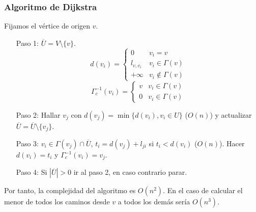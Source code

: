 \documentclass[AL.tex]{subfiles}
\begin{document}
\subsubsection{Algoritmo de Dijkstra}
Fijamos el vértice de origen $v$. 
\begin{enumerate}
\item[Paso 1:] $\overline{U}=V\setminus\{v\}$. $$d(v_i)=\begin{cases}
0 & v_i=v\\
l_{v,v_i} & v_i\in\Gamma(v)\\
+\infty & v_i\notin\Gamma(v)
\end{cases}$$
$$\Gamma^{-1}_c(v_i)=\begin{cases}
v & v_i\in\Gamma(v)\\
0 & v_i\in\Gamma(v)
\end{cases}$$
\item[Paso 2:] Hallar $v_j$ con $d(v_j)=\min\{d(v_i), v_i\in U\}$ ($O(n)$) y actualizar $\overline{U}=\overline{U}\setminus\{v_j\}$.
\item[Paso 3:] $v_i\in \Gamma(v_j)\cap\overline{U}$, $t_i=d(v_j)+l_{ji}$ si $t_i<d(v_i)$ ($O(n)$). Hacer $d(v_i)=t_i$ y $\Gamma^{-1}_c(v_i)=v_j$.
\item[Paso 4:] Si $|\overline{U}|>0$ ir al paso 2, en caso contrario parar. 
\end{enumerate}
Por tanto, la complejidad del algoritmo es $O(n^2)$. En el caso de calcular el menor de todos los caminos desde $v$ a todos los demás sería $O(n^3)$. 
\end{document}
